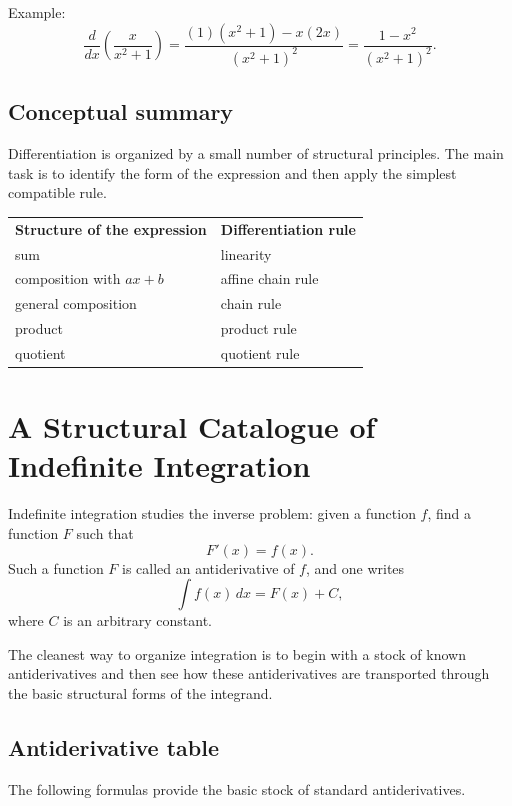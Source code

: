 \documentclass{article}
\begin{document}
	Example:
	\[
	\frac{d}{dx}\left(\frac{x}{x^2+1}\right)
	=
	\frac{(1)(x^2+1)-x(2x)}{(x^2+1)^2}
	=
	\frac{1-x^2}{(x^2+1)^2}.
	\]
	
	\subsection{Conceptual summary}
	
	Differentiation is organized by a small number of structural principles.  
	The main task is to identify the form of the expression and then apply the simplest compatible rule.
	
	\begin{center}
		\begin{tabular}{ll}
			\textbf{Structure of the expression} & \textbf{Differentiation rule} \\[4pt]
			sum & linearity \\[4pt]
			composition with \(ax+b\) & affine chain rule \\[4pt]
			general composition & chain rule \\[4pt]
			product & product rule \\[4pt]
			quotient & quotient rule
		\end{tabular}
	\end{center}
	
	\vspace{1em}
	
	\section{A Structural Catalogue of Indefinite Integration}
	
	Indefinite integration studies the inverse problem: given a function \(f\), find a function \(F\) such that
	\[
	F'(x)=f(x).
	\]
	Such a function \(F\) is called an antiderivative of \(f\), and one writes
	\[
	\int f(x)\,dx=F(x)+C,
	\]
	where \(C\) is an arbitrary constant.
	
	The cleanest way to organize integration is to begin with a stock of known antiderivatives and then see how these antiderivatives are transported through the basic structural forms of the integrand.
	
	\subsection{Antiderivative table}
	
	The following formulas provide the basic stock of standard antiderivatives.
	
\end{document}
